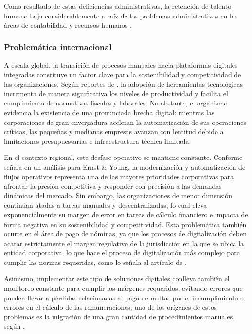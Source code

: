 Como resultado de estas deficiencias administrativas, la retención de talento humano baja considerablemente a raíz de los problemas 
administrativos en las áreas de contabilidad y recursos humanos \parencite{andina2026problemas}.

\subsubsection{Problemática internacional}

A escala global, la transición de procesos manuales hacia plataformas digitales 
integradas constituye un factor clave para la sostenibilidad y competitividad 
de las organizaciones. Según reportes de \textcite{bancomundial2024},
la adopción de herramientas tecnológicas incrementa de manera significativa 
los niveles de productividad y facilita el cumplimiento de normativas fiscales
y laborales. No obstante, el organismo evidencia la existencia de una pronunciada
brecha digital: mientras las corporaciones de gran envergadura aceleran 
la automatización de sus operaciones críticas, las pequeñas y medianas empresas 
avanzan con lentitud debido a limitaciones presupuestarias e infraestructura técnica limitada.

En el contexto regional, este desfase operativo se mantiene constante. Conforme señala \textcite{valenteneto2025}
en un análisis para Ernst \& Young, la modernización y automatización de
flujos operativos representa una de las mayores prioridades 
corporativas para afrontar la presión competitiva y responder
con precisión a las demandas dinámicas del mercado.
Sin embargo, las organizaciones de menor dimensión
continúan atadas a tareas manuales y descentralizadas, lo cual eleva 
exponencialmente su margen de error en tareas de cálculo financiero
e impacta de forma negativa en su sostenibilidad y competitividad.
Esta problemática también ocurre en el área de pago de nóminas, ya que los procesos de digitalización 
deben acatar estrictamente el margen regulativo de la jurisdicción en la que se ubica la entidad corporativa, 
lo que hace el proceso de digitalización más complejo para cumplir las normas requeridas, como lo señala el artículo de \textcite{nativeteams2025challenges}.

Asimismo, implementar este tipo de soluciones digitales conlleva también el monitoreo constante para cumplir los márgenes requeridos,
evitando errores que pueden llevar a pérdidas relacionadas al pago de multas por el incumplimiento o errores en el cálculo de las remuneraciones; 
uno de los orígenes de estos problemas es la migración de una gran cantidad de procedimientos manuales, según \textcite{mandu2026errores}.

